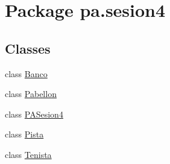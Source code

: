 \hypertarget{namespacepa_1_1sesion4}{}\section{Package pa.\+sesion4}
\label{namespacepa_1_1sesion4}
\subsection*{Classes}
\begin{DoxyCompactItemize}
\item 
class \mbox{\hyperlink{classpa_1_1sesion4_1_1_banco}{Banco}}
\item 
class \mbox{\hyperlink{classpa_1_1sesion4_1_1_pabellon}{Pabellon}}
\item 
class \mbox{\hyperlink{classpa_1_1sesion4_1_1_p_a_sesion4}{P\+A\+Sesion4}}
\item 
class \mbox{\hyperlink{classpa_1_1sesion4_1_1_pista}{Pista}}
\item 
class \mbox{\hyperlink{classpa_1_1sesion4_1_1_tenista}{Tenista}}
\end{DoxyCompactItemize}
